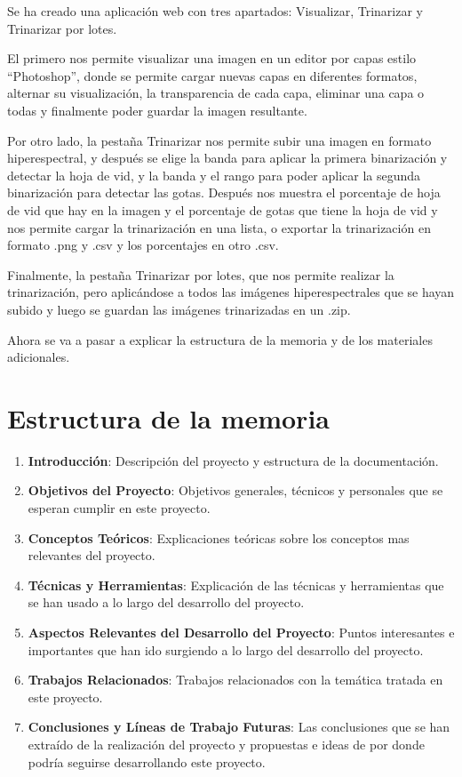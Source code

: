 
Se ha creado una aplicación web con tres apartados: Visualizar, Trinarizar y Trinarizar por lotes. 

El primero nos permite visualizar una imagen en un editor por capas estilo “Photoshop”, donde se permite cargar nuevas capas en diferentes formatos, alternar su visualización, la transparencia de cada capa, eliminar una capa o todas y finalmente poder guardar la imagen resultante.

Por otro lado, la pestaña Trinarizar nos permite subir una imagen en formato hiperespectral, y después se elige la banda para aplicar la primera binarización y detectar la hoja de vid, y la banda y el rango para poder aplicar la segunda binarización para detectar las gotas. Después nos muestra el porcentaje de hoja de vid que hay en la imagen y el porcentaje de gotas que tiene la hoja de vid y nos permite cargar la trinarización en una lista, o exportar la trinarización en formato .png y .csv y los porcentajes en otro .csv.

Finalmente, la pestaña Trinarizar por lotes, que nos permite realizar la trinarización, pero aplicándose a todos las imágenes hiperespectrales que se hayan subido y luego se guardan las imágenes trinarizadas en un .zip.

Ahora se va a pasar a explicar la estructura de la memoria y de los materiales adicionales.

\section{Estructura de la memoria}
\begin{enumerate}
    \item \textbf{Introducción}: Descripción del proyecto y estructura de la documentación.
    \item \textbf{Objetivos del Proyecto}: Objetivos generales, técnicos y personales que se esperan cumplir en este proyecto.
    \item \textbf{Conceptos Teóricos}: Explicaciones teóricas sobre los conceptos mas relevantes del proyecto.
    \item \textbf{Técnicas y Herramientas}: Explicación de las técnicas y herramientas que se han usado a lo largo del desarrollo del proyecto.
    \item \textbf{Aspectos Relevantes del Desarrollo del Proyecto}: Puntos interesantes e importantes que han ido surgiendo a lo largo del desarrollo del proyecto.
    \item \textbf{Trabajos Relacionados}: Trabajos relacionados con la temática tratada en este proyecto.
    \item \textbf{Conclusiones y Líneas de Trabajo Futuras}: Las conclusiones que se han extraído de la realización del proyecto y propuestas e ideas de por donde podría seguirse desarrollando este proyecto.
\end{enumerate}

